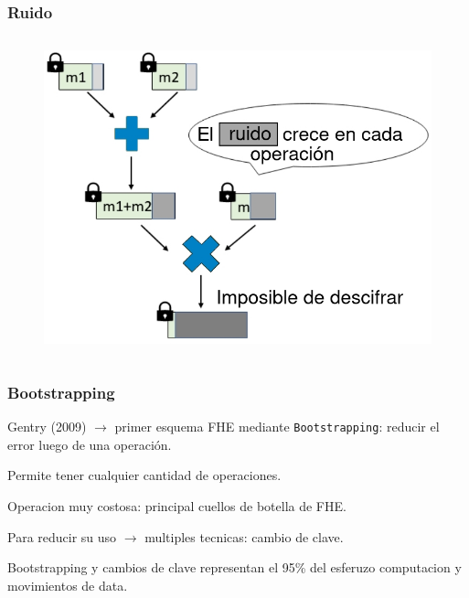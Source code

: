 \documentclass[handout]{beamer}
\begin{document}
\begin{frame}
\frametitle{Ruido}
\begin{columns}

        \begin{figure}[h!]
            \centering
            \includegraphics[scale=0.25]{multNoise.jpg}
        \end{figure}
\end{columns}


\end{frame}


\begin{frame}
\frametitle{Bootstrapping}
Gentry (2009) $\to$ primer  esquema FHE mediante \texttt{Bootstrapping}: reducir el error luego de una operación.

Permite tener cualquier cantidad de operaciones.

Operacion muy costosa: principal cuellos de botella de FHE.

Para reducir su uso $\to$ multiples tecnicas: cambio de clave.


\begin{mdframed}[backgroundcolor=frenchblue!20]
  Bootstrapping y cambios de clave representan el 95\% del esferuzo computacion y movimientos de data.
\end{mdframed}
\end{frame}
\end{document}
